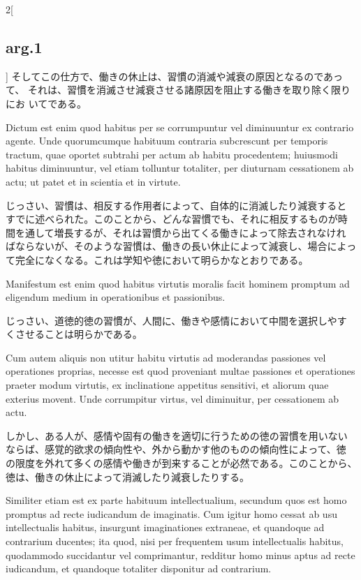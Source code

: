 \documentclass[paper=a4paper,fontsize=10pt,jafontsize=9pt,titlepage]{jlreq}
\begin{document}
\begin{paracol}{2}[\subsection{arg.1}]
そしてこの仕方で、働きの休止は、習慣の消滅や減衰の原因となるのであって、
それは、習慣を消滅させ減衰させる諸原因を阻止する働きを取り除く限りにお
いてである。

\switchcolumn*

Dictum est enim quod habitus per se corrumpuntur vel diminuuntur ex
contrario agente. Unde quorumcumque habituum contraria subcrescunt per
temporis tractum, quae oportet subtrahi per actum ab habitu
procedentem; huiusmodi habitus diminuuntur, vel etiam tolluntur
totaliter, per diuturnam cessationem ab actu; ut patet et in scientia
et in virtute.

\switchcolumn

じっさい、習慣は、相反する作用者によって、自体的に消滅したり減衰すると
すでに述べられた。このことから、どんな習慣でも、それに相反するものが時
間を通して増長するが、それは習慣から出てくる働きによって除去されなけれ
ばならないが、そのような習慣は、働きの長い休止によって減衰し、場合によっ
て完全になくなる。これは学知や徳において明らかなとおりである。

\switchcolumn*

Manifestum est enim quod habitus virtutis moralis facit hominem
promptum ad eligendum medium in operationibus et passionibus.

\switchcolumn

じっさい、道徳的徳の習慣が、人間に、働きや感情において中間を選択しやす
くさせることは明らかである。

\switchcolumn*

Cum autem aliquis non utitur habitu virtutis ad moderandas passiones
vel operationes proprias, necesse est quod proveniant multae passiones
et operationes praeter modum virtutis, ex inclinatione appetitus
sensitivi, et aliorum quae exterius movent. Unde corrumpitur virtus,
vel diminuitur, per cessationem ab actu.

\switchcolumn

しかし、ある人が、感情や固有の働きを適切に行うための徳の習慣を用いない
ならば、感覚的欲求の傾向性や、外から動かす他のものの傾向性によって、徳
の限度を外れて多くの感情や働きが到来することが必然である。このことから、
徳は、働きの休止によって消滅したり減衰したりする。

\switchcolumn*

Similiter etiam est ex parte habituum intellectualium, secundum quos
est homo promptus ad recte iudicandum de imaginatis.  Cum igitur homo
cessat ab usu intellectualis habitus, insurgunt imaginationes
extraneae, et quandoque ad contrarium ducentes; ita quod, nisi per
frequentem usum intellectualis habitus, quodammodo succidantur vel
comprimantur, redditur homo minus aptus ad recte iudicandum, et
quandoque totaliter disponitur ad contrarium.


\end{paracol}
\end{document}
